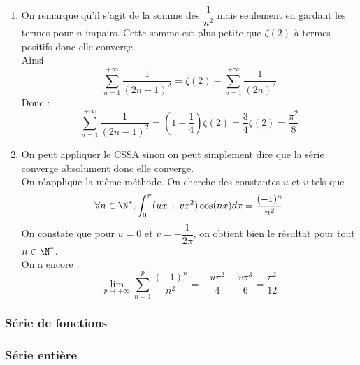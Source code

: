 \documentclass{book}
\begin{document}
\begin{enumerate}[leftmargin=*]
		La fonction $x\mapsto (u+vx)\varphi(x)$ étant de classe $\mathcal{C}^1$ sur $[0,\pi]$, on peut appliquer la question $1$ :
		\[\lim\limits_{p\to+\infty}\int_{0}^{\pi}(u+vx)\varphi(x)\sin\left(\left(p+\frac{1}{2}\right)x\right)dx=0\]
		Par conséquent, on a :
		\[\lim\limits_{p\to+\infty}\sum_{n=1}^{p}\frac{1}{n^2}=-\frac{1}{2}\int_{0}^{\pi}(ux+vx^2)dx=-\frac{u\pi^2}{4}-\frac{v\pi^3}{6}=\frac{\pi^2}{6}\]
		d'où : 
		\[\zeta(2)=\frac{\pi^2}{6}\]
		\item 
		On remarque qu'il s'agit de la somme des $\dfrac{1}{n^2}$ mais seulement en gardant les termes pour $n$ impairs. Cette somme est plus petite que $\zeta(2)$ à termes positifs donc elle converge.\\
		Ainsi \[\sum_{n=1}^{+\infty}\frac{1}{(2n-1)^2}=\zeta(2)-\sum_{n=1}^{+\infty}\frac{1}{(2n)^2}\]
		Donc :
		\[\sum_{n=1}^{+\infty}\frac{1}{(2n-1)^2}=\left(1-\frac{1}{4}\right)\zeta(2)=\frac{3}{4}\zeta(2)=\frac{\pi^2}{8}\]
		\item On peut appliquer le CSSA sinon on peut simplement dire que la série converge absolument donc elle converge.\\
		On réapplique la même méthode. On cherche des constantes $u$ et $v$ tels que \[\forall n\in\N^*, \int_{0}^\pi(ux+vx^2)\cos(nx)dx=\frac{(-1)^n}{n^2}\]
		On constate que pour $u=0$ et $v=-\dfrac{1}{2\pi}$, on obtient bien le résultat pour tout $n\in\N^*$.\\
		On a encore : \[\lim\limits_{p\to+\infty}\sum_{n=1}^{p}\frac{(-1)^n}{n^2}=-\frac{u\pi^2}{4}-\frac{v\pi^3}{6}=\frac{\pi^2}{12}\]
	\end{enumerate}
	
	\subsubsection{Série de fonctions}
	
	\subsubsection{Série entière}
	
\end{document}
